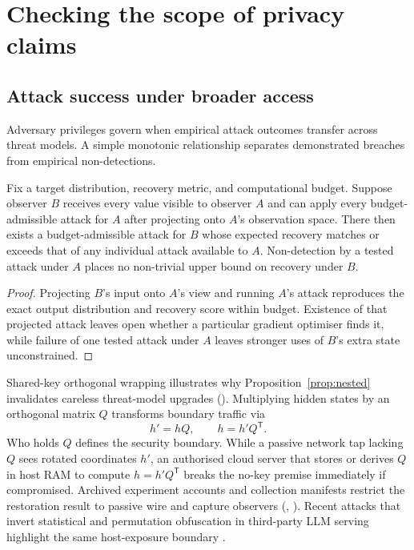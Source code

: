 \section{Checking the scope of privacy claims}
\label{sec:scopechecks}

\subsection{Attack success under broader access}

Adversary privileges govern when empirical attack outcomes transfer across
threat models. A simple monotonic relationship separates demonstrated
breaches from empirical non-detections.

\begin{samepage}
\begin{proposition}
\label{prop:nested}
Fix a target distribution, recovery metric, and computational budget.
Suppose observer $B$ receives every value visible to observer $A$ and can
apply every budget-admissible attack for $A$ after projecting onto $A$'s
observation space. There then exists a budget-admissible attack for $B$
whose expected recovery matches or exceeds that of any individual attack
available to $A$. Non-detection by a tested attack under $A$ places no
non-trivial upper bound on recovery under $B$.
\end{proposition}
\begin{proof}
Projecting $B$'s input onto $A$'s view and running $A$'s attack reproduces
the exact output distribution and recovery score within budget. Existence
of that projected attack leaves open whether a particular gradient
optimiser finds it, while failure of one tested attack under $A$ leaves
stronger uses of $B$'s extra state unconstrained.
\end{proof}
\end{samepage}

Shared-key orthogonal wrapping illustrates why
Proposition~\ref{prop:nested} invalidates careless threat-model upgrades
(). Multiplying hidden states by an orthogonal matrix $Q$
transforms boundary traffic via
\begin{equation}
 h'=hQ,\qquad h=h'Q^{\mathsf T}.
 \label{eq:rotation}
\end{equation}
Who holds $Q$ defines the security boundary. While a passive network tap
lacking $Q$ sees rotated coordinates $h'$, an authorised cloud server that
stores or derives $Q$ in host RAM to compute $h=h'Q^{\mathsf T}$ breaks the
no-key premise immediately if compromised. Archived experiment accounts and
collection manifests restrict the restoration result to passive wire and
capture observers (, ). Recent attacks that
invert statistical and permutation obfuscation in third-party LLM serving
highlight the same host-exposure boundary \cite{permattack2025}.


